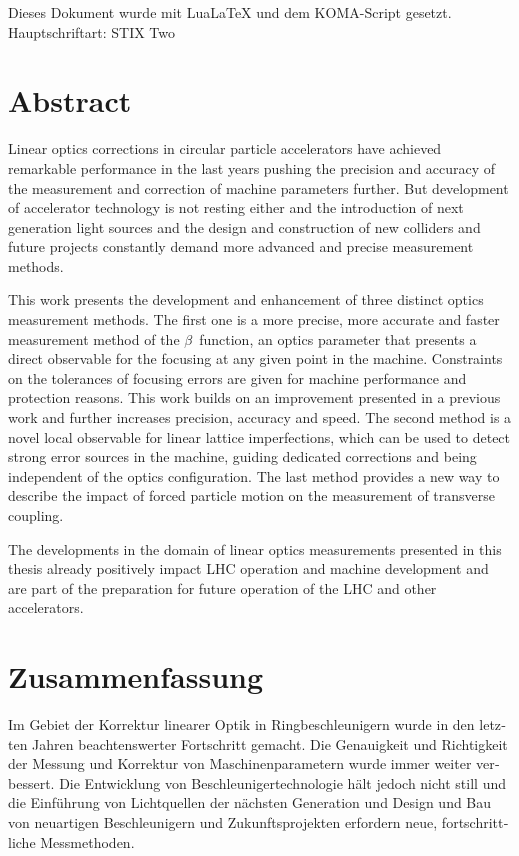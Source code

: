 \vfill
\renewcommand\baselinestretch{\textlinespread}\selectfont
\noindent Dieses Dokument wurde mit LuaLaTeX und dem KOMA-Script gesetzt.\\
Hauptschriftart: STIX Two

\chapter*{Abstract}

Linear optics corrections in circular particle accelerators have achieved remarkable performance in the last years %
pushing the precision and accuracy of the measurement and correction of machine parameters further.
But development of accelerator technology is not resting either and the introduction of
next generation light sources and the design and construction of new colliders and future projects
constantly demand more advanced and precise measurement methods.

This work presents the development and enhancement of three distinct optics measurement methods.
The first one is a more precise, more accurate and faster measurement method of the $\beta$~function,
an optics parameter that presents a direct observable for the focusing at any given point in the machine.
Constraints on the tolerances of focusing errors are given for machine performance and protection reasons.
This work builds on an improvement presented in a previous work and further increases precision, accuracy and speed.
The second method is a novel local observable for linear lattice imperfections, which can be used to detect
strong error sources in the machine, guiding dedicated corrections and being independent of the optics configuration.
The last method provides a new way to describe the impact of forced particle motion on the measurement of transverse coupling.

The developments in the domain of linear optics measurements presented in this thesis
already positively impact LHC operation and machine development and are part of the preparation for
future operation of the LHC and other accelerators.


\chapter*{Zusammenfassung}
\foreignlanguage{ngerman}{
Im Gebiet der Korrektur linearer Optik in Ringbeschleunigern wurde in den letzten Jahren beachtenswerter Fortschritt gemacht.
Die Genauigkeit und Richtigkeit der Messung und Korrektur von Maschinenparametern wurde immer weiter verbessert.
Die Entwicklung von Beschleunigertechnologie hält jedoch nicht still und die Einführung von Lichtquellen der nächsten Generation
und Design und Bau von neuartigen Beschleunigern und Zukunftsprojekten erfordern neue, fortschrittliche Messmethoden.
}

